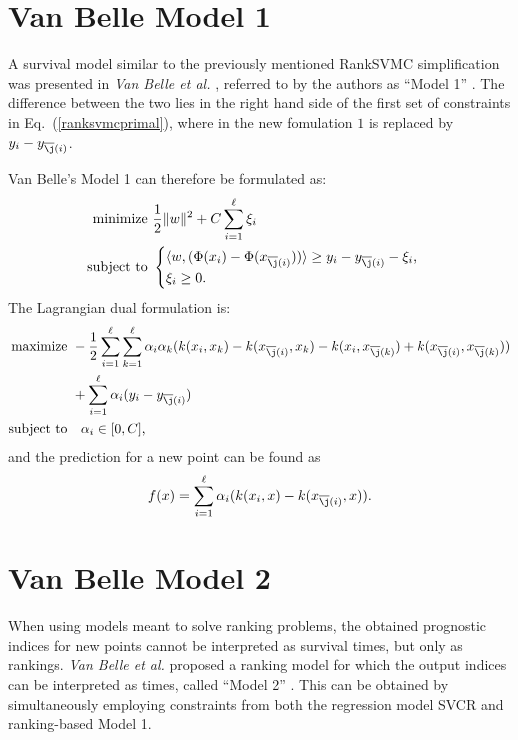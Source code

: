 \documentclass[12pt]{report}
\begin{document}
\section{Van Belle Model 1}
A survival model similar to the previously mentioned RankSVMC simplification was presented in \textit{Van Belle et al.} \cite{vanbelle11b}, referred to by the authors as ``Model 1'' \cite{vanbelle11}. The difference between the two lies in the right hand side of the first set of constraints in Eq.\ (\ref{ranksvmcprimal}), where in the new fomulation $1$ is replaced by $y_{i} - y_{\overline{\j}(i)}$.

Van Belle's Model 1 can therefore be formulated as:
\begin{equation} \label{model1primal}
\begin{split}
\text{minimize} &\ \dfrac{1}{2}\| w \|^2 + C\sum_{i=1}^{\ell}\xi_{i} \\
\text{subject to} &\ \begin{cases}
\langle w,(\Phi(x_{i}) - \Phi(x_{\overline{\j}(i)})) \rangle \geq y_{i} - y_{\overline{\j}(i)} - \xi_{i} \text{,}\\
\xi_{i} \geq 0 \text{.}
\end{cases}
\end{split}
\end{equation}
The Lagrangian dual formulation is:
\begin{equation} \label{model1dual}
\begin{split}
\text{maximize} &\
-\dfrac{1}{2}\sum_{i=1}^{\ell}\sum_{k=1}^{\ell}\alpha_{i}\alpha_{k}(k(x_{i},x_{k})-k(x_{\overline{\j}(i)},x_{k})-k(x_{i},x_{\overline{\j}(k)})+k(x_{\overline{\j}(i)},x_{\overline{\j}(k)})) \\
&\ + \sum_{i=1}^{\ell}\alpha_{i}(y_{i} - y_{\overline{\j}(i)}) \\
\text{subject to} &\quad \alpha_{i} \in [0,C] \text{,}
\end{split}
\end{equation}
and the prediction for a new point can be found as
\begin{equation} \label{model1f}
f(x) = \sum_{i=1}^{\ell}\alpha_{i}(k(x_{i},x) - k(x_{\overline{\j}(i)},x)) \text{.}
\end{equation}

\section{Van Belle Model 2}
When using models meant to solve ranking problems, the obtained prognostic indices for new points cannot be interpreted as survival times, but only as rankings. \textit{Van Belle et al.} proposed a ranking model for which the output indices can be interpreted as times, called ``Model 2'' \cite{vanbelle11}. This can be obtained by simultaneously employing constraints from both the regression model SVCR and ranking-based Model 1.
\end{document}
